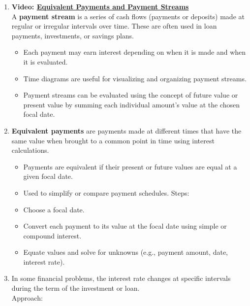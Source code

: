 \documentclass[
]{book}
\providecommand{\tightlist}{%
  \setlength{\itemsep}{0pt}\setlength{\parskip}{0pt}}
\begin{document}
\begin{enumerate}
\def\labelenumi{\arabic{enumi}.}
\tightlist
\item
  \textbf{Video: \href{https://youtu.be/HLUDkVUHNwM}{Equivalent Payments and Payment Streams}}\\
  A \textbf{payment stream} is a series of cash flows (payments or deposits) made at regular or irregular intervals over time. These are often used in loan payments, investments, or savings plans.

  \begin{itemize}
  \tightlist
  \item
    Each payment may earn interest depending on when it is made and when it is evaluated.
  \item
    Time diagrams are useful for visualizing and organizing payment streams.
  \item
    Payment streams can be evaluated using the concept of future value or present value by summing each individual amount's value at the chosen focal date.
  \end{itemize}
\item
  \textbf{Equivalent payments} are payments made at different times that have the same value when brought to a common point in time using interest calculations.

  \begin{itemize}
  \tightlist
  \item
    Payments are equivalent if their present or future values are equal at a given focal date.
  \item
    Used to simplify or compare payment schedules.
    Steps:
  \item
    Choose a focal date.
  \item
    Convert each payment to its value at the focal date using simple or compound interest.
  \item
    Equate values and solve for unknowns (e.g., payment amount, date, interest rate).
  \end{itemize}
\item
  In some financial problems, the interest rate changes at specific intervals during the term of the investment or loan.\\
  Approach:


\end{enumerate}
\end{document}
